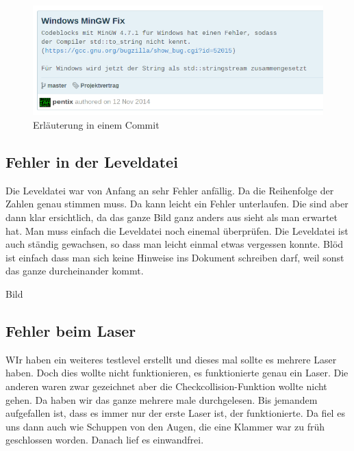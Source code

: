 \documentclass[12pt,a4paper]{scrartcl}
\begin{document}
\begin{figure}[h]
\centering
\includegraphics[scale=0.8]{img/e419eef.png}
\caption{Erläuterung in einem Commit}
\end{figure}

\subsection{Fehler in der Leveldatei}
Die Leveldatei war von Anfang an sehr Fehler anfällig. Da die Reihenfolge der Zahlen  genau stimmen muss. Da kann leicht ein Fehler unterlaufen. Die sind aber dann klar ersichtlich, da das ganze Bild ganz anders aus sieht als man erwartet hat. Man muss einfach die Leveldatei noch einemal überprüfen. Die Leveldatei ist auch ständig gewachsen, so dass man leicht einmal etwas vergessen konnte. Blöd ist einfach dass man sich keine Hinweise ins Dokument schreiben darf, weil sonst das ganze durcheinander kommt.

Bild

\subsection{Fehler beim Laser}
WIr haben ein weiteres testlevel erstellt und dieses mal sollte es mehrere Laser haben. Doch dies wollte nicht funktionieren, es funktionierte genau ein Laser. Die anderen waren zwar gezeichnet aber die Checkcollision-Funktion wollte nicht gehen. Da haben wir das ganze mehrere male durchgelesen. Bis jemandem aufgefallen ist, dass es immer nur der erste Laser ist, der funktionierte. Da fiel es uns dann auch wie Schuppen von den Augen, die eine Klammer war zu früh geschlossen worden. Danach lief es einwandfrei.
\end{document}
